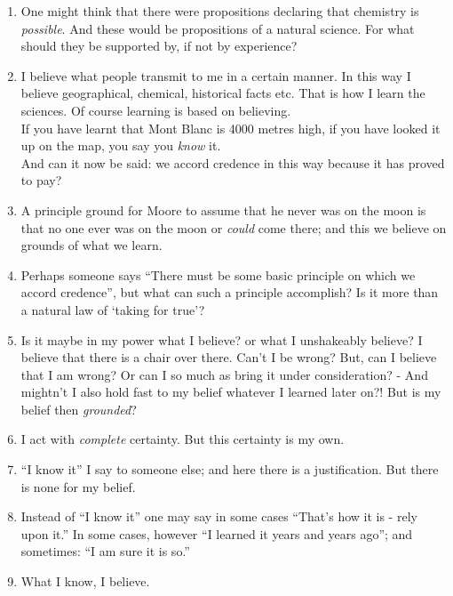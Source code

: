 \documentclass{book}
\begin{document}
\begin{enumerate}
\item
One might think that there were propositions declaring that chemistry is
\emph{possible}. And these would be propositions of a natural science. For what
should they be supported by, if not by experience?

\item
I believe what people transmit to me in a certain manner. In this way I believe
geographical, chemical, historical facts etc. That is how I learn the sciences.
Of course learning is based on believing. \\
If you have learnt that Mont Blanc is 4000 metres high, if you have looked it
up on the map, you say you \emph{know} it. \\
And can it now be said: we accord credence in this way because it has proved to
pay?

\item
A principle ground for Moore to assume that he never was on the moon is that no
one ever was on the moon or \emph{could} come there; and this we believe on
grounds of what we learn.

\item
Perhaps someone says ``There must be some basic principle on which we accord
credence'', but what can such a principle accomplish? Is it more than a natural
law of `taking for true'?

\item
Is it maybe in my power what I believe? or what I unshakeably believe?  I
believe that there is a chair over there. Can't I be wrong? But, can I believe
that I am wrong? Or can I so much as bring it under consideration? - And
mightn't I also hold fast to my belief whatever I learned later on?! But is my
belief then \emph{grounded}?

\item
I act with \emph{complete} certainty. But this certainty is my own.

\item
``I know it'' I say to someone else; and here there is a justification. But
there is none for my belief.

\item
Instead of ``I know it'' one may say in some cases ``That's how it is - rely
upon it.'' In some cases, however ``I learned it years and years ago''; and
sometimes: ``I am sure it is so.''

\item
What I know, I believe.


\end{enumerate}
\end{document}
